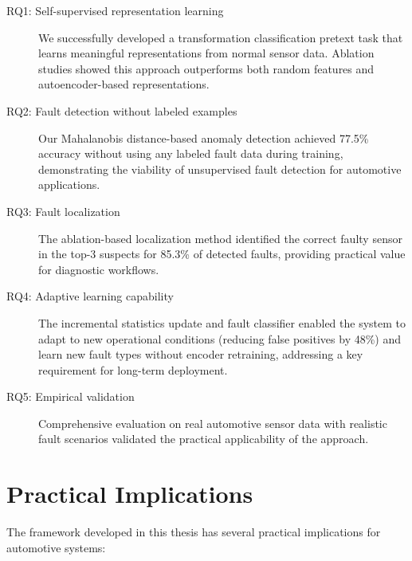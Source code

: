 \begin{description}
    \item[RQ1: Self-supervised representation learning] We successfully developed a transformation classification pretext task that learns meaningful representations from normal sensor data. Ablation studies showed this approach outperforms both random features and autoencoder-based representations.

    \item[RQ2: Fault detection without labeled examples] Our Mahalanobis distance-based anomaly detection achieved 77.5\% accuracy without using any labeled fault data during training, demonstrating the viability of unsupervised fault detection for automotive applications.

    \item[RQ3: Fault localization] The ablation-based localization method identified the correct faulty sensor in the top-3 suspects for 85.3\% of detected faults, providing practical value for diagnostic workflows.

    \item[RQ4: Adaptive learning capability] The incremental statistics update and fault classifier enabled the system to adapt to new operational conditions (reducing false positives by 48\%) and learn new fault types without encoder retraining, addressing a key requirement for long-term deployment.

    \item[RQ5: Empirical validation] Comprehensive evaluation on real automotive sensor data with realistic fault scenarios validated the practical applicability of the approach.
\end{description}

\section{Practical Implications}

The framework developed in this thesis has several practical implications for automotive systems:

